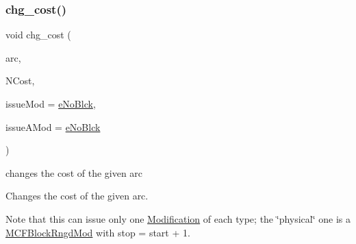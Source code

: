 \subsubsection{\texorpdfstring{chg\+\_\+cost()}{chg\_cost()}}
{\footnotesize\ttfamily void chg\+\_\+cost (\begin{DoxyParamCaption}\item[{\mbox{\hyperlink{class_s_m_spp__di__unipi__it_1_1_m_c_f_block_aee6156e2ce80720d57a082d80f39d8cc}{c\+\_\+\+Index}}}]{arc,  }\item[{\mbox{\hyperlink{class_s_m_spp__di__unipi__it_1_1_m_c_f_block_a8e47cae4e16e180273d262aae769a854}{c\+\_\+\+C\+Number}}}]{N\+Cost,  }\item[{\mbox{\hyperlink{group___modification___t_y_p_e_s_ga544246d8c462e9a2d817c2c30797968f}{c\+\_\+\+Mod\+Param}}}]{issue\+Mod = {\ttfamily \mbox{\hyperlink{group___modification___t_y_p_e_s_gga48fddcdd03a03f49b7e389ca1ed938d4ada69e89c5f46e563d8a13cfa6830c136}{e\+No\+Blck}}},  }\item[{\mbox{\hyperlink{group___modification___t_y_p_e_s_ga544246d8c462e9a2d817c2c30797968f}{c\+\_\+\+Mod\+Param}}}]{issue\+A\+Mod = {\ttfamily \mbox{\hyperlink{group___modification___t_y_p_e_s_gga48fddcdd03a03f49b7e389ca1ed938d4ada69e89c5f46e563d8a13cfa6830c136}{e\+No\+Blck}}} }\end{DoxyParamCaption})}



changes the cost of the given arc 

Changes the cost of the given arc.

Note that this can issue only one \mbox{\hyperlink{class_s_m_spp__di__unipi__it_1_1_modification}{Modification}} of each type; the \char`\"{}physical\char`\"{} one is a \mbox{\hyperlink{class_s_m_spp__di__unipi__it_1_1_m_c_f_block_rngd_mod}{M\+C\+F\+Block\+Rngd\+Mod}} with stop = start + 1. \mbox{\label{class_s_m_spp__di__unipi__it_1_1_m_c_f_block_a41c883dcdfab5eef37487ea9970cd9ee}} 

